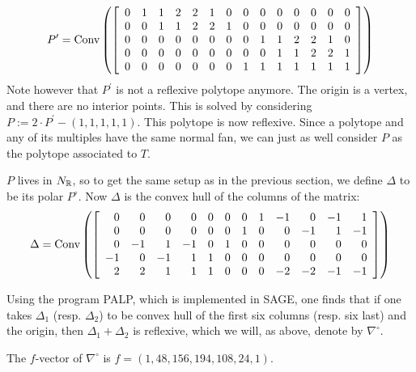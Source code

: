 \documentclass[11pt, english]{article}
\begin{document}
\[
P^\prime = \Conv \left( \left[
\begin{array}{*{14}c}
0 & 1 & 1 & 2 & 2 & 1 & 0 & 0 & 0 & 0 & 0 & 0 & 0 & 0 \\
0 & 0 & 1 & 1 & 2 & 2 & 1 & 0 & 0 & 0 & 0 & 0 & 0 & 0 \\
0 & 0 & 0 & 0 & 0 & 0 & 0 & 0 & 1 & 1 & 2 & 2 & 1 & 0 \\
0 & 0 & 0 & 0 & 0 & 0 & 0 & 0 & 0 & 1 & 1 & 2 & 2 & 1 \\
0 & 0 & 0 & 0 & 0 & 0 & 0 & 1 & 1 & 1 & 1 & 1 & 1 & 1
\end{array} \right] \right)
\]
Note however that $P^\prime$ is not a reflexive polytope anymore. The origin is a vertex, and there are no interior points. This is solved by considering $P := 2 \cdot P^\prime - (1,1,1,1,1)$. This polytope is now reflexive. Since a polytope and any of its multiples have the same normal fan, we can just as well consider $P$ as the polytope associated to $T$.


$P$ lives in $N_{\mathbb{R}}$, so to get the same setup as in the previous section, we define $\Delta$ to be its polar $P^\circ$. Now $\Delta$ is the convex hull of the columns of the matrix:
\[
\Delta = \operatorname{Conv} \left(
\left[\begin{array}{rrrrrrrrrrrr}
0  & 0  & 0 & 0 & 0 & 0 &  0 & 1 & -1 & 0  & -1 & 1 \\
0  & 0  & 0 & 0 & 0 & 0 &  1 & 0 & 0  & -1 & 1  & -1 \\
0  & -1 & 1 & -1& 0 & 1 &  0 & 0 & 0  & 0  & 0  & 0 \\
-1 & 0  &-1 & 1 & 1 & 0 &  0 & 0 & 0  & 0  & 0  & 0 \\
2  & 2  & 1 & 1 & 1 & 0 &  0 & 0 & -2 & -2 & -1 & -1
\end{array}\right]\right)
\]

Using the program PALP, which is implemented in SAGE, one finds that if one takes $\Delta_1$ (resp. $\Delta_2$) to be convex hull of the first six columns (resp. six last) and the origin, then $\Delta_1+\Delta_2$ is reflexive, which we will, as above, denote by $\nabla^\circ$.

\begin{lemma}
  The $f$-vector of $\nabla^\circ$ is $f=(1, 48, 156, 194, 108, 24, 1)$. 
\end{lemma}
\end{document}
